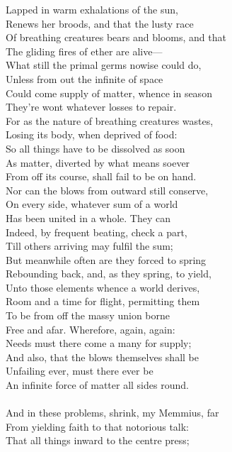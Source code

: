 Lapped in warm exhalations of the sun,\\
Renews her broods, and that the lusty race\\
Of breathing creatures bears and blooms, and that\\
The gliding fires of ether are alive—\\
What still the primal germs nowise could do,\\
Unless from out the infinite of space\\
Could come supply of matter, whence in season\\
They're wont whatever losses to repair.\\
For as the nature of breathing creatures wastes,\\
Losing its body, when deprived of food:\\
So all things have to be dissolved as soon\\
As matter, diverted by what means soever\\
From off its course, shall fail to be on hand.\\
Nor can the blows from outward still conserve,\\
On every side, whatever sum of a world\\
Has been united in a whole. They can\\
Indeed, by frequent beating, check a part,\\
Till others arriving may fulfil the sum;\\
But meanwhile often are they forced to spring\\
Rebounding back, and, as they spring, to yield,\\
Unto those elements whence a world derives,\\
Room and a time for flight, permitting them\\
To be from off the massy union borne\\
Free and afar. Wherefore, again, again:\\
Needs must there come a many for supply;\\
And also, that the blows themselves shall be\\
Unfailing ever, must there ever be\\
An infinite force of matter all sides round.\\
\\
And in these problems, shrink, my Memmius, far\\
From yielding faith to that notorious talk:\\
That all things inward to the centre press;\\
